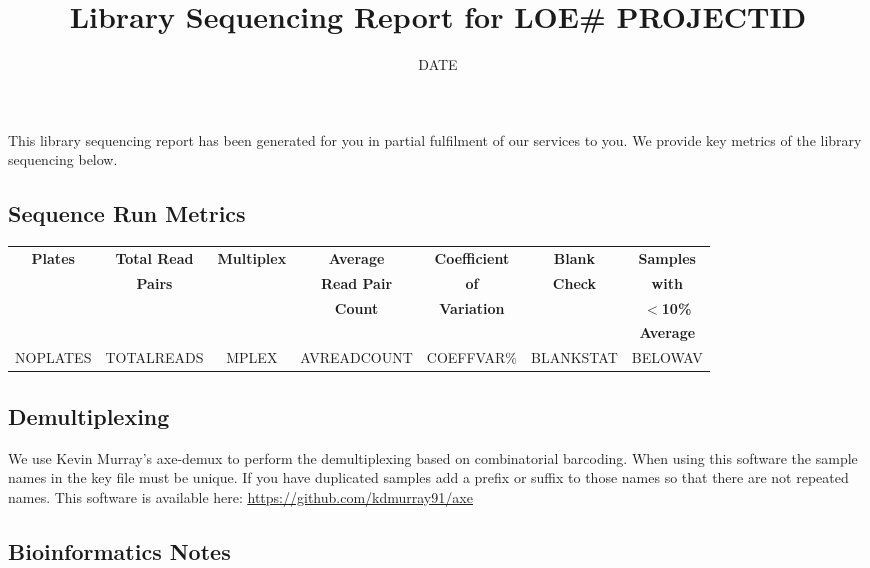 \documentclass[hidelinks,12pt]{article}
\title{\textbf{Library Sequencing Report for LOE\# PROJECTID}\vspace{-3em}} %
\date{DATE \vspace{-2em}} %
\begin{document}
\maketitle
This library sequencing report has been generated for you in partial fulfilment of our services to you. 
We provide key metrics of the library sequencing below.

\subsection*{Sequence Run Metrics}

\begin{table}[h]
	\centering
	\begin{tabular}{|c|c|c|c|c|c|c|}
		\hline
		\textbf{Plates} & \textbf{Total Read} & \textbf{Multiplex} & \textbf{Average} & \textbf{Coefficient} & \textbf{Blank} & \textbf{Samples} \\
		{} & \textbf{Pairs} & {} & \textbf{Read Pair} & \textbf{of} & \textbf{Check} & \textbf{with} \\
		{} & {} & {} & \textbf{Count} & \textbf{Variation} & {} & \textbf{$<$10\%} \\
		{} & {} & {} & {} & {} & {} & \textbf{Average} \\
		\hline 
		NOPLATES & TOTALREADS & MPLEX & AVREADCOUNT & COEFFVAR\% & BLANKSTAT & BELOWAV \\
		\hline
	\end{tabular}
\end{table}

\subsection*{Demultiplexing} 

We use Kevin Murray's axe-demux to perform the demultiplexing based on combinatorial barcoding. 
When using this software the sample names in the key file must be unique. 
If you have duplicated samples add a prefix or suffix to those names so that there are not repeated names. 
This software is available here: \newline \href{https://github.com/kdmurray91/axe}{\color{blue}\underline{https://github.com/kdmurray91/axe}}

\subsection*{Bioinformatics Notes}
\end{document}
